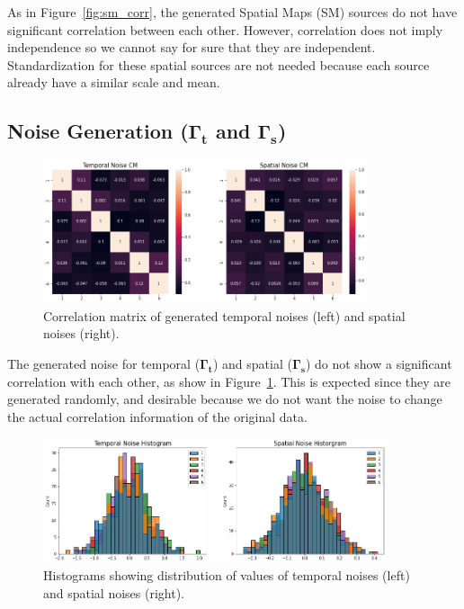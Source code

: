\documentclass[11pt]{article}
\begin{document}
As in Figure~\ref{fig:sm_corr}, the generated Spatial Maps (SM) sources do not have significant correlation between each other. However, correlation does not imply independence so we cannot say for sure that they are independent. Standardization for these spatial sources are not needed because each source already have a similar scale and mean.

\subsection{Noise Generation ($\mathbf{\Gamma_t}$ and $\mathbf{\Gamma_s}$)}

  \begin{figure}[H]
      \begin{center}
         \includegraphics[width=0.85\textwidth]{../plots/1_4_temporal_and_spatial_noise_CM}
        \caption{Correlation matrix of generated temporal noises (left) and spatial noises (right).}
        \label{fig:noise_corr}
      \end{center}
    \end{figure}

The generated noise for temporal ($\mathbf{\Gamma_t}$) and spatial ($\mathbf{\Gamma_s}$) do not show a significant correlation with each other, as show in Figure~\ref{fig:noise_corr}. This is expected since they are generated randomly, and desirable because we do not want the noise to change the actual correlation information of the original data.
  
    \begin{figure}[H]
      \begin{center}
         \includegraphics[width=0.9\textwidth]{../plots/1_4_temporal_and_spatial_noise_hist}
        \caption{Histograms showing distribution of values of temporal noises (left) and spatial noises (right).}
        \label{fig:noise_hist}
      \end{center}
    \end{figure}
\end{document}
